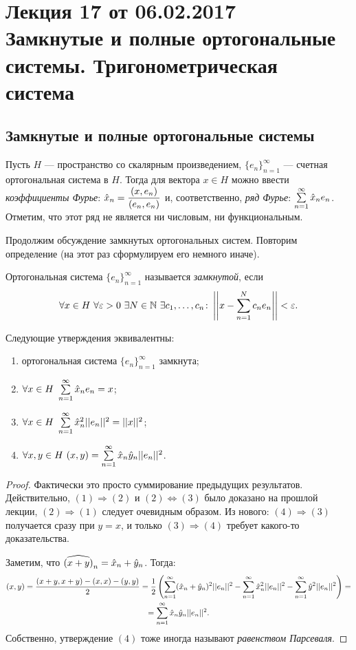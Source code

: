 \section{Лекция 17 от 06.02.2017 \\ Замкнутые и полные ортогональные системы. Тригонометрическая система}
\subsection{Замкнутые и полные ортогональные системы}
Пусть $H$ --- пространство со скалярным произведением, $\{e_n\}_{n=1}^{\infty}$  --- счетная ортогональная система в $H$. Тогда для вектора $x \in H$ можно ввести \textit{коэффициенты Фурье}: $\hat{x}_n = \dfrac{(x, e_n)}{(e_n, e_n)}$ и, соответственно, \textit{ряд Фурье}: $\sum\limits_{n=1}^{\infty} \hat{x}_ne_n $. Отметим, что этот ряд не является ни числовым, ни функциональным.

Продолжим обсуждение замкнутых ортогональных систем. Повторим определение (на этот раз сформулируем его немного иначе).
\begin{Def}
Ортогональная система $\{e_n\}_{n=1}^{\infty}$ называется \textit{замкнутой}, если
$$
\forall x \in H \ \forall \varepsilon > 0 \ \exists N \in \mathbb{N} \ \exists c_1, \ldots, c_n \colon \left|\left|x - \sum\limits_{n=1}^{N}c_ne_n\right|\right| < \varepsilon.
$$
\end{Def}

\begin{Theorem}
    \label{16equiv}
Следующие утверждения эквивалентны:
\begin{enumerate}
\item ортогональная система $\{e_n\}_{n=1}^{\infty}$ замкнута;
\item $\forall x \in H \  \sum\limits_{n=1}^{\infty}\hat{x}_ne_n = x$;
\item $\forall x \in H \ \sum\limits_{n=1}^{\infty} \hat{x}^2_n||e_n||^2 = ||x||^2 $;
\item $\forall x, y \in H \ (x, y) = \sum\limits_{n=1}^{\infty} \hat{x}_n\hat{y}_n||e_n||^2$.
\end{enumerate}
\end{Theorem}
\begin{proof}
Фактически это просто суммирование предыдущих результатов. Действительно, $(1) \Rightarrow (2)$ и $(2) \Leftrightarrow (3)$ было доказано на прошлой лекции, $(2) \Rightarrow (1)$ следует очевидным образом.  Из нового: $(4) \Rightarrow (3)$ получается сразу при $y = x$, и только $(3) \Rightarrow (4)$ требует какого-то доказательства.

Заметим, что $\widehat{(x + y)}_n = \hat{x}_n + \hat{y}_n$. Тогда:
\begin{gather*}
(x, y) = \frac{(x + y, x+y) - (x, x) - (y, y)}{2} = \frac{1}{2} \left( \sum\limits_{n=1}^{\infty} (\hat{x}_n + \hat{y}_n)^2 ||e_n||^2 - \sum\limits_{n=1}^{\infty} \hat{x}_n^2||e_n||^2 - \sum\limits_{n=1}^{\infty} \hat{y}^2||e_n||^2 \right) = \\ = \sum\limits_{n=1}^{\infty} \hat{x}_n\hat{y}_n||e_n||^2.
\end{gather*}
Собственно, утверждение $(4)$ тоже иногда называют \textit{равенством Парсеваля}.
\end{proof}

